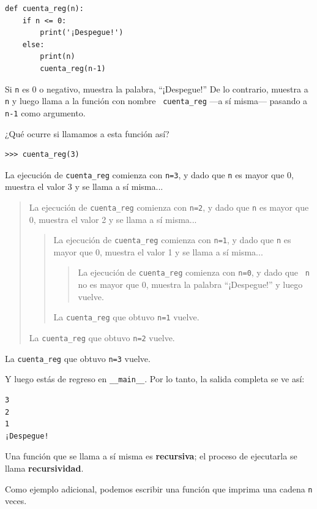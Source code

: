 \documentclass[10pt]{book}
\begin{document}
\begin{verbatim}
def cuenta_reg(n):
    if n <= 0:
        print('¡Despegue!')
    else:
        print(n)
        cuenta_reg(n-1)
\end{verbatim}
%
Si {\tt n} es 0 o negativo, muestra la palabra, ``¡Despegue!''
De lo contrario, muestra a {\tt n} y luego llama a la función con nombre {\tt
cuenta\_reg} ---a sí misma--- pasando a {\tt n-1} como argumento.

¿Qué ocurre si llamamos a esta función así?

\begin{verbatim}
>>> cuenta_reg(3)
\end{verbatim}
%
La ejecución de {\tt cuenta\_reg} comienza con {\tt n=3}, y dado que
{\tt n} es mayor que 0, muestra el valor 3 y se llama a sí misma...

\begin{quote}
La ejecución de {\tt cuenta\_reg} comienza con {\tt n=2}, y dado que
{\tt n} es mayor que 0, muestra el valor 2 y se llama a sí misma...

\begin{quote}
La ejecución de {\tt cuenta\_reg} comienza con {\tt n=1}, y dado que
{\tt n} es mayor que 0, muestra el valor 1 y se llama a sí misma...

\begin{quote}
La ejecución de {\tt cuenta\_reg} comienza con {\tt n=0}, y dado que {\tt
n} no es mayor que 0, muestra la palabra ``¡Despegue!'' y luego
vuelve.
\end{quote}

La {\tt cuenta\_reg} que obtuvo {\tt n=1} vuelve.
\end{quote}

La {\tt cuenta\_reg} que obtuvo {\tt n=2} vuelve.
\end{quote}

La {\tt cuenta\_reg} que obtuvo {\tt n=3} vuelve.

Y luego estás de regreso en \verb"__main__".  Por lo tanto, la
salida completa se ve así:

\begin{verbatim}
3
2
1
¡Despegue!
\end{verbatim}
%
Una función que se llama a sí misma es {\bf recursiva}; el proceso de
ejecutarla se llama {\bf recursividad}.

Como ejemplo adicional, podemos escribir una función que imprima una
cadena {\tt n} veces.
\end{document}

